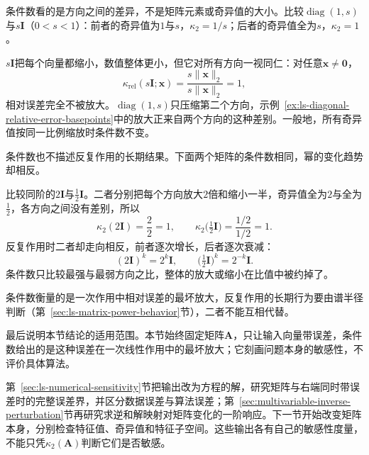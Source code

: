 条件数看的是方向之间的差异，不是矩阵元素或奇异值的大小。比较$\operatorname{diag}(1,s)$与$s\bm I$（$0<s<1$）：前者的奇异值为$1$与$s$，$\kappa_2=1/s$；后者的奇异值全为$s$，$\kappa_2=1$。

$s\bm I$把每个向量都缩小，数值整体更小，但它对所有方向一视同仁：对任意$\bm x\neq\bm0$，
\[
 \kappa_{\mathrm{rel}}(s\bm I;\bm x)=\frac{s\lVert\bm x\rVert_2}{s\lVert\bm x\rVert_2}=1 ,
\]
相对误差完全不被放大。$\operatorname{diag}(1,s)$只压缩第二个方向，示例~\ref{ex:ls-diagonal-relative-error-basepoints}中的放大正来自两个方向的这种差别。一般地，所有奇异值按同一比例缩放时条件数不变。

条件数也不描述反复作用的长期结果。下面两个矩阵的条件数相同，幂的变化趋势却相反。
\begin{example}[条件数相同而幂的趋势相反]
\label{ex:ls-condition-number-vs-powers}
比较同阶的$2\bm I$与$\tfrac12\bm I$。二者分别把每个方向放大$2$倍和缩小一半，奇异值全为$2$与全为$\tfrac12$，各方向之间没有差别，所以
\[
 \kappa_2(2\bm I)=\frac{2}{2}=1,\qquad
 \kappa_2\bigl(\tfrac12\bm I\bigr)=\frac{1/2}{1/2}=1 .
\]
反复作用时二者却走向相反，前者逐次增长，后者逐次衰减：
\[
 (2\bm I)^k=2^k\bm I,\qquad
 \bigl(\tfrac12\bm I\bigr)^k=2^{-k}\bm I .
\]
条件数只比较最强与最弱方向之比，整体的放大或缩小在比值中被约掉了。
\end{example}
条件数衡量的是一次作用中相对误差的最坏放大，反复作用的长期行为要由谱半径判断（第~\ref{sec:ls-matrix-power-behavior}节），二者不能互相代替。

最后说明本节结论的适用范围。本节始终固定矩阵$\bm A$，只让输入向量带误差，条件数给出的是这种误差在一次线性作用中的最坏放大；它刻画问题本身的敏感性，不评价具体算法。

第~\ref{sec:ls-numerical-sensitivity}节把输出改为方程的解，研究矩阵与右端同时带误差时的完整误差界，并区分数据误差与算法误差；第~\ref{sec:multivariable-inverse-perturbation}节再研究求逆和解映射对矩阵变化的一阶响应。下一节开始改变矩阵本身，分别检查特征值、奇异值和特征子空间。这些输出各有自己的敏感性度量，不能只凭$\kappa_2(\bm A)$判断它们是否敏感。
